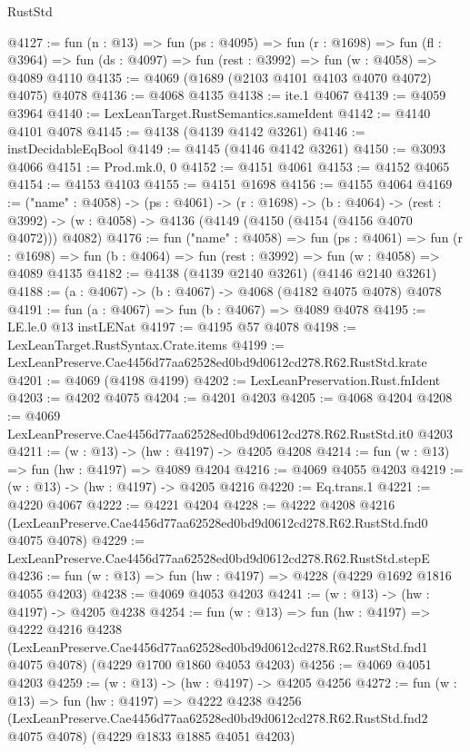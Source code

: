 \begin{lexlean}{RustStd}
\begin{coremodule}
@4127 := fun (n : @13) =>
  fun (ps : @4095) =>
  fun (r : @1698) =>
  fun (fl : @3964) => fun (ds : @4097) => fun (rest : @3992) => fun (w : @4058) => @4089 @4110
@4135 := @4069 (@1689 (@2103 @4101 @4103 @4070 @4072) @4075) @4078
@4136 := @4068 @4135
@4138 := ite.{1} @4067
@4139 := @4059 @3964
@4140 := LexLeanTarget.RustSemantics.sameIdent
@4142 := @4140 @4101 @4078
@4145 := @4138 (@4139 @4142 @3261)
@4146 := instDecidableEqBool
@4149 := @4145 (@4146 @4142 @3261)
@4150 := @3093 @4066
@4151 := Prod.mk.{0, 0}
@4152 := @4151 @4061
@4153 := @4152 @4065
@4154 := @4153 @4103
@4155 := @4151 @1698
@4156 := @4155 @4064
@4169 := ("name" : @4058) ->
  (ps : @4061) ->
  (r : @1698) ->
  (b : @4064) ->
  (rest : @3992) -> (w : @4058) -> @4136 (@4149 (@4150 (@4154 (@4156 @4070 @4072))) @4082)
@4176 := fun ("name" : @4058) =>
  fun (ps : @4061) =>
  fun (r : @1698) => fun (b : @4064) => fun (rest : @3992) => fun (w : @4058) => @4089 @4135
@4182 := @4138 (@4139 @2140 @3261) (@4146 @2140 @3261)
@4188 := (a : @4067) -> (b : @4067) -> @4068 (@4182 @4075 @4078) @4078
@4191 := fun (a : @4067) => fun (b : @4067) => @4089 @4078
@4195 := LE.le.{0} @13 instLENat
@4197 := @4195 @57 @4078
@4198 := LexLeanTarget.RustSyntax.Crate.items
@4199 := LexLeanPreserve.Cae4456d77aa62528ed0bd9d0612cd278.R62.RustStd.krate
@4201 := @4069 (@4198 @4199)
@4202 := LexLeanPreservation.Rust.fnIdent
@4203 := @4202 @4075
@4204 := @4201 @4203
@4205 := @4068 @4204
@4208 := @4069 LexLeanPreserve.Cae4456d77aa62528ed0bd9d0612cd278.R62.RustStd.it0 @4203
@4211 := (w : @13) -> (hw : @4197) -> @4205 @4208
@4214 := fun (w : @13) => fun (hw : @4197) => @4089 @4204
@4216 := @4069 @4055 @4203
@4219 := (w : @13) -> (hw : @4197) -> @4205 @4216
@4220 := Eq.trans.{1}
@4221 := @4220 @4067
@4222 := @4221 @4204
@4228 := @4222
    @4208
    @4216
    (LexLeanPreserve.Cae4456d77aa62528ed0bd9d0612cd278.R62.RustStd.fnd0 @4075 @4078)
@4229 := LexLeanPreserve.Cae4456d77aa62528ed0bd9d0612cd278.R62.RustStd.stepE
@4236 := fun (w : @13) => fun (hw : @4197) => @4228 (@4229 @1692 @1816 @4055 @4203)
@4238 := @4069 @4053 @4203
@4241 := (w : @13) -> (hw : @4197) -> @4205 @4238
@4254 := fun (w : @13) =>
  fun (hw : @4197) =>
  @4222
    @4216
    @4238
    (LexLeanPreserve.Cae4456d77aa62528ed0bd9d0612cd278.R62.RustStd.fnd1 @4075 @4078)
    (@4229 @1700 @1860 @4053 @4203)
@4256 := @4069 @4051 @4203
@4259 := (w : @13) -> (hw : @4197) -> @4205 @4256
@4272 := fun (w : @13) =>
  fun (hw : @4197) =>
  @4222
    @4238
    @4256
    (LexLeanPreserve.Cae4456d77aa62528ed0bd9d0612cd278.R62.RustStd.fnd2 @4075 @4078)
    (@4229 @1833 @1885 @4051 @4203)

\end{coremodule}
\end{lexlean}
